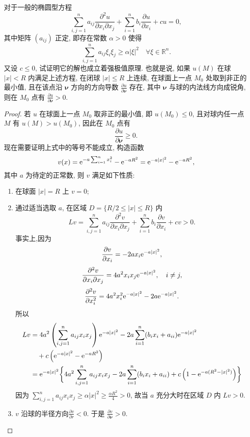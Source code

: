 \begin{exercise}[6]
  对于一般的椭圆型方程
  \[\sum_{i,j=1}^n a_{ij}\frac{\partial^2u}{\partial x_i\partial x_j}
    + \sum_{i=1}^n b_i \frac{\partial u}{\partial x_i} + cu = 0,\]
  其中矩阵 $(a_{ij})$ 正定, 即存在常数 $\alpha>0$ 使得
  \[\sum_{i,j=1}^n a_{ij}\xi_i\xi_j \geq \alpha|\xi|^2\quad
    \forall\xi\in \mathbb{R}^n.\]
  又设 $c\leq 0$, 试证明它的解也成立着强极值原理.
  也就是说, 如果 $u(M)$ 在球 $|x|<R$ 内满足上述方程, 在闭球 $|x|\leq R$ 上连续,
  在球面上一点 $M_0$ 处取到非正的最小值, 且在该点沿 $\bm{\nu}$ 方向的方向导数
  $\frac{\partial u}{\partial \bm{\nu}}$ 存在, 其中 $\bm{\nu}$ 与球的内法线方向成锐角,
  则在 $M_0$ 点有 $\frac{\partial u}{\partial \bm{\nu}}>0$.
\end{exercise}

\begin{proof}
  若 $u$ 在球面上一点 $M_0$ 取非正的最小值, 即 $u(M_0)\leq 0$,
  且对球内任一点 $M$ 有 $u(M)>u(M_0)$, 因此在 $M_0$ 点有
  \[\frac{\partial u}{\partial\bm{\nu}}\geq 0.\]
  现在需要证明上式中的等号不能成立, 构造函数
  \[v(x) = \mathrm{e}^{-a\sum_{i=1}^nx_i^2} - \mathrm{e}^{-aR^2} = \mathrm{e}^{-a|x|^2} - \mathrm{e}^{-aR^2},\]
  其中 $a$ 为待定的正常数, 则 $v$ 满足如下性质:
  \begin{enumerate}[(1)]
    \item 在球面 $|x|=R$ 上 $v=0$;
    \item 通过适当选取 $a$, 在区域 $D=\{ R/2 \leq |x| \leq R\}$ 内
      \[Lv = \sum_{i,j=1}^na_{ij}\frac{\partial^2v}{\partial x_i\partial x_j}
        + \sum_{i=1}^nb_i\frac{\partial v}{\partial x_i}+cv > 0.\]
      事实上,因为
      \[\frac{\partial v}{\partial x_i} = -2a x_i \mathrm{e}^{-a|x|^2},\]
      \[\frac{\partial^2v}{\partial x_i\partial x_j} = 4a^2 x_i x_j 
        \mathrm{e}^{-a|x|^2},\quad i\neq j,\]
      \[\frac{\partial^2v}{\partial x_i^2} = 4a^2 x_i^2 \mathrm{e}^{-a|x|^2}
        -2a \mathrm{e}^{-a|x|^2}.\]
      所以
      \begin{align*}
      Lv
      & = 4a^2\left(\sum_{i,j=1}^na_{ij}x_ix_j\right) \mathrm{e}^{-a|x|^2}
        - 2a \sum_{i=1}^n (b_ix_i + a_{ii}) \mathrm{e}^{-a|x|^2} \\
      & \quad + c \left(\mathrm{e}^{-a|x|^2} - \mathrm{e}^{-aR^2}\right) \\
      & = \mathrm{e}^{-a|x|^2} \biggl\{ 4a^2\sum_{i,j=1}^n a_{ij} x_i x_j
        - 2a\sum_{i=1}^n (b_i x_i + a_{ii}) + c \left(1 - \mathrm{e}^{-a(R^2-|x|^2)}\right)\biggr\}
      \end{align*}
      因为 $\sum_{i,j=1}^n a_{ij} x_i x_j \geq \alpha |x|^2 \geq \frac{\alpha R^2}{4} > 0$,
      故当 $a$ 充分大时在区域 $D$ 内 $Lv > 0$.
    \item $v$ 沿球的半径方向$\frac{\partial v}{\partial r}<0$.
        于是 $\frac{\partial v}{\partial\bm{\nu}} > 0$.
  \end{enumerate}


\end{proof}
